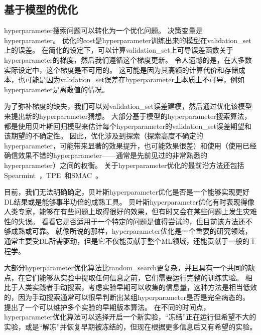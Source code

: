 
\subsection{基于模型的优化}
\label{sec:model_based_hyperparameter_optimization}
\gls{hyperparameter}搜索问题可以转化为一个优化问题。
决策变量是\gls{hyperparameter}。
优化的\gls{cost}是\gls{hyperparameter}训练出来的模型在\gls{validation_set}上的误差。
在简化的设定下，可以计算\gls{validation_set}上可导误差函数关于\gls{hyperparameter}的梯度，然后我们遵循这个梯度更新\citep{bengio:1999:snowbird,bengio-hyper-NC00,maclaurin2015gradient}。
令人遗憾的是，在大多数实际设定中，这个梯度是不可用的。
这可能是因为其高额的计算代价和存储成本，也可能是因为\gls{validation_set}误差在\gls{hyperparameter}上本质上不可导，例如\gls{hyperparameter}是离散值的情况。


为了弥补梯度的缺失，我们可以对\gls{validation_set}误差建模，然后通过优化该模型来提出新的\gls{hyperparameter}猜想。
大部分基于模型的\gls{hyperparameter}搜索算法，都是使用贝叶斯回归模型来估计每个\gls{hyperparameter}的\gls{validation_set}误差期望和该期望的不确定性。
因此，优化涉及到探索（探索高度不确定的\gls{hyperparameter}，可能带来显著的效果提升，也可能效果很差）和使用（使用已经确信效果不错的\gls{hyperparameter}——通常是先前见过的非常熟悉的\gls{hyperparameter}）之间的权衡。
关于\gls{hyperparameter}优化的最前沿方法还包括Spearmint~\citep{Snoek+al-NIPS2012-small}，TPE~\citep{Bergstra+al-NIPS2011}和SMAC~\citep{hutter+hoos+leyton+brown:2011}。


目前，我们无法明确确定，贝叶斯\gls{hyperparameter}优化是否是一个能够实现更好\gls{DL}结果或是能够事半功倍的成熟工具。
贝叶斯\gls{hyperparameter}优化有时表现得像人类专家，能够在有些问题上取得很好的效果，但有时又会在某些问题上发生灾难性的失误。
看看它是否适用于一个特定的问题是值得尝试的，但目前该方法还不够成熟或可靠。
就像所说的那样，\gls{hyperparameter}优化是一个重要的研究领域，通常主要受\gls{DL}所需驱动，但是它不仅能贡献于整个\gls{ML}领域，还能贡献于一般的工程学。


大部分\gls{hyperparameter}优化算法比\gls{random_search}更复杂，并且具有一个共同的缺点，在它们能够从实验中提取任何信息之前，它们需要运行完整的训练实验。
相比于人类实践者手动搜索，考虑实验早期可以收集的信息量，这种方法是相当低效的，因为手动搜索通常可以很早判断出某组\gls{hyperparameter}是否是完全病态的。
\cite{swersky2014freeze}提出了一个可以维护多个实验的早期版本算法。
在不同的时间点，\gls{hyperparameter}优化算法可以选择开启一个新实验，``冻结''正在运行但希望不大的实验，或是``解冻''并恢复早期被冻结的，但现在根据更多信息后又有希望的实验。


